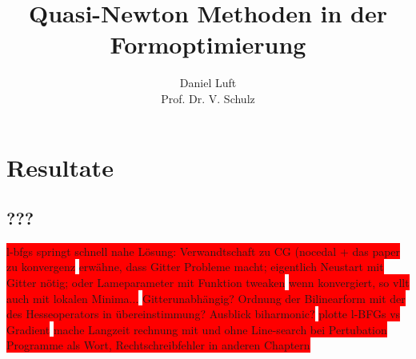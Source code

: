 \documentclass[bibliography=totoc,12pt,a4paper]{scrartcl}
\theoremstyle{exampstyle}
\numberwithin{equation}{section}
\begin{document}
\title{Quasi-Newton Methoden in der Formoptimierung}

\author{Daniel Luft \\ Prof. Dr. V. Schulz}

  \pagestyle{empty}

  \pagestyle{headings}
  

\section{Resultate}
\subsection{???}

\colorbox{red}{l-bfgs springt schnell nahe Lösung: Verwandtschaft zu CG (nocedal + das paper zu konvergenz}
\colorbox{red}{erwähne, dass Gitter Probleme macht; eigentlich Neustart mit Gitter nötig; oder Lameparameter mit Funktion tweaken}
\colorbox{red}{wenn konvergiert, so vllt auch mit lokalen Minima...}
\colorbox{red}{Gitterunabhängig? Ordnung der Bilinearform mit der des Hesseoperators in übereinstimmung? Ausblick biharmonic?}
\colorbox{red}{plotte l-BFGs vs Gradient}
\colorbox{red}{mache Langzeit rechnung mit und ohne Line-search bei Pertubation}
\colorbox{red}{Programme als Wort, Rechtschreibfehler in anderen Chaptern}
\end{document}
